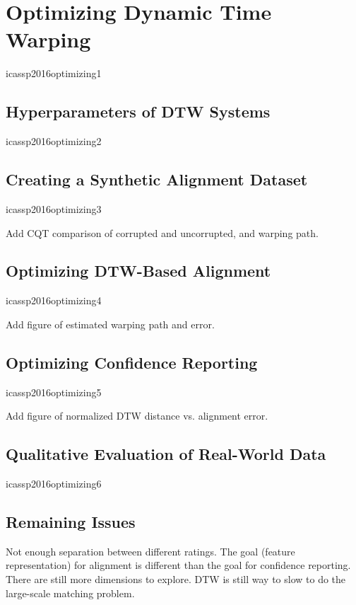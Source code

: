 \chapter{Optimizing Dynamic Time Warping}
\label{ch:dtw}

icassp2016optimizing1

\section{Hyperparameters of DTW Systems}

icassp2016optimizing2

\section{Creating a Synthetic Alignment Dataset}

icassp2016optimizing3

Add CQT comparison of corrupted and uncorrupted, and warping path.

\section{Optimizing DTW-Based Alignment}

icassp2016optimizing4

Add figure of estimated warping path and error.

\section{Optimizing Confidence Reporting}

icassp2016optimizing5

Add figure of normalized DTW distance vs. alignment error.

\section{Qualitative Evaluation of Real-World Data}

icassp2016optimizing6

\section{Remaining Issues}

Not enough separation between different ratings.
The goal (feature representation) for alignment is different than the goal for confidence reporting.
There are still more dimensions to explore.
DTW is still way to slow to do the large-scale matching problem.
